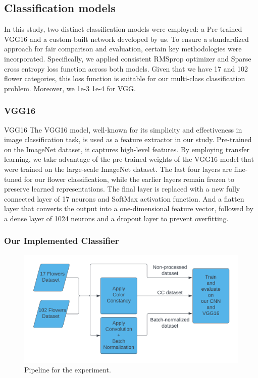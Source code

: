 \subsection{Classification models}

In this study, two distinct classification models were employed: a Pre-trained VGG16 and a custom-built network developed by us. 
To ensure a standardized approach for fair comparison and evaluation, certain key methodologies were incorporated. 
Specifically, we applied consistent RMSprop optimizer and Sparse cross entropy loss function across both models.
 Given that we have 17 and 102 flower categories, this loss function is suitable for our multi-class classification problem. Moreover, we 1e-3 
1e-4 for VGG. 


\subsubsection{VGG16}

VGG16
The VGG16 model, well-known for its simplicity and effectiveness in image classification task, is used as a feature extractor in our study. Pre-trained on the ImageNet dataset, it captures high-level features. 
By employing transfer learning, we take advantage of the pre-trained weights of the VGG16 model that were trained on the large-scale ImageNet dataset. 
The last four layers are fine-tuned for our flower classification, while the earlier layers remain frozen to preserve learned representations. 
The final layer is replaced with a new fully connected layer of 17 neurons and SoftMax activation function. And a flatten layer that converts the output into a one-dimensional feature vector, followed by a dense layer of 1024 neurons and a dropout layer to prevent overfitting. 

\subsubsection{Our Implemented Classifier}

\begin{figure}[ht]
    \centering
    \includegraphics[width=\textwidth]{images/experiment_pipeline.png}
    \caption{Pipeline for the experiment.}
    \label{fig:experiment_pipeline}
\end{figure}

